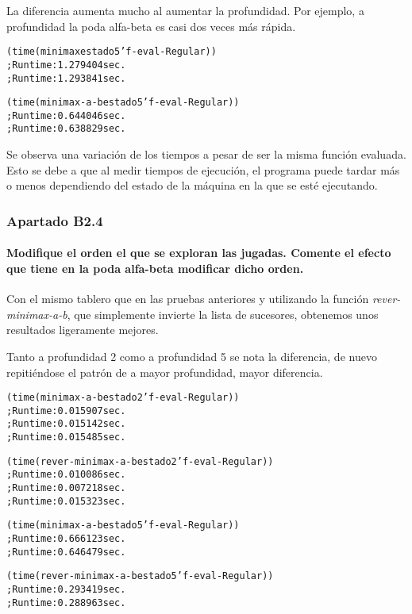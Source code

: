 \documentclass{apuntes}
\begin{document}
La diferencia aumenta mucho al aumentar la profundidad. Por ejemplo, a profundidad la poda alfa-beta es casi dos veces más rápida.

\begin{alltt}
(time (minimax estado 5 'f-eval-Regular)) 
  ; Run time: 1.279404 sec.
  ; Run time: 1.293841 sec.

(time (minimax-a-b estado 5 'f-eval-Regular)) 
  ; Run time: 0.644046 sec.
  ; Run time: 0.638829 sec.

\end{alltt}

Se observa una variación de los tiempos a pesar de ser la misma función evaluada. Esto se debe a que al medir tiempos de ejecución, el programa puede tardar más o menos dependiendo del estado de la máquina en la que se esté ejecutando.

\subsubsection*{Apartado B2.4}

\paragraph{Modifique el orden el que se exploran las jugadas. Comente el efecto que tiene en la poda alfa-beta modificar dicho orden. \\} 

Con el mismo tablero que en las pruebas anteriores y utilizando la función \textit{rever-minimax-a-b}, que simplemente invierte la lista de sucesores, obtenemos unos resultados ligeramente mejores. 

Tanto a profundidad 2 como a profundidad 5 se nota la diferencia, de nuevo repitiéndose el patrón de a mayor profundidad, mayor diferencia.

\begin{alltt}
(time (minimax-a-b estado 2 'f-eval-Regular)) 
  ; Run time: 0.015907 sec.
  ; Run time: 0.015142 sec.
  ; Run time: 0.015485 sec.

(time (rever-minimax-a-b estado 2 'f-eval-Regular)) 
  ; Run time: 0.010086 sec.
  ; Run time: 0.007218 sec.
  ; Run time: 0.015323 sec.

(time (minimax-a-b estado 5 'f-eval-Regular)) 
  ; Run time: 0.666123 sec.
  ; Run time: 0.646479 sec.

(time (rever-minimax-a-b estado 5 'f-eval-Regular)) 
  ; Run time: 0.293419 sec.
  ; Run time: 0.288963 sec.
\end{alltt}
\end{document}
